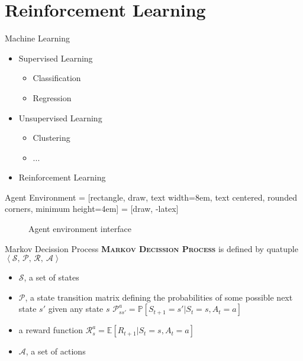 \section{Reinforcement Learning}

\begin{frame}[fragile]{Machine Learning}
\begin{itemize}
  \item Supervised Learning
    \begin{itemize}
      \item Classification
      \item Regression
    \end{itemize}
  \item Unsupervised Learning
    \begin{itemize}
      \item Clustering
      \item ...
    \end{itemize}
  \item \alert{Reinforcement Learning}
\end{itemize}
\end{frame}

\begin{frame}[fragile]{Agent Environment}
 = [rectangle, draw,
text width=8em, text centered, rounded corners, minimum height=4em]
 = [draw, -latex]
\begin{figure}
    \caption{Agent environment interface}
\end{figure}
\end{frame}

\begin{frame}[fragile]{Markov Decission Process}
   \textbf{\textsc{Markov Decission Process}} is defined by  quatuple  $\left\langle \mathcal{S},\, \mathcal{P},\, \mathcal{R} ,\ \mathcal{A} \right\rangle $
\begin{itemize}
    \item $\mathcal{S}$, a set of states
    \item  $\mathcal{P}$, a state transition matrix defining the probabilities of some possible next state $s'$ given any state $s$
          $\mathcal{P}^a_{ss'}= \mathbb{P} [ S_{t+1}=s'|S_{t}=s , A_t = a ]$
    \item a reward function $\mathcal{R}^a_s=\mathbb{E}[R_{t+1}|S_{t}=s , A_t = a ]$
    \item $\mathcal{A}$, a set of actions
\end{itemize}
\end{frame}

